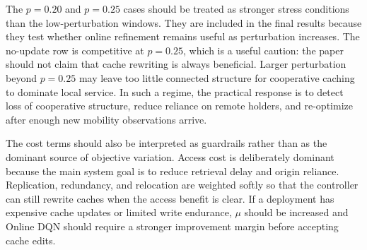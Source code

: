 The \(p=0.20\) and \(p=0.25\) cases should be treated as stronger stress conditions than the low-perturbation windows. They are included in the final results because they test whether online refinement remains useful as perturbation increases. The no-update row is competitive at \(p=0.25\), which is a useful caution: the paper should not claim that cache rewriting is always beneficial. Larger perturbation beyond \(p=0.25\) may leave too little connected structure for cooperative caching to dominate local service. In such a regime, the practical response is to detect loss of cooperative structure, reduce reliance on remote holders, and re-optimize after enough new mobility observations arrive.

The cost terms should also be interpreted as guardrails rather than as the dominant source of objective variation. Access cost is deliberately dominant because the main system goal is to reduce retrieval delay and origin reliance. Replication, redundancy, and relocation are weighted softly so that the controller can still rewrite caches when the access benefit is clear. If a deployment has expensive cache updates or limited write endurance, \(\mu\) should be increased and Online DQN should require a stronger improvement margin before accepting cache edits.
